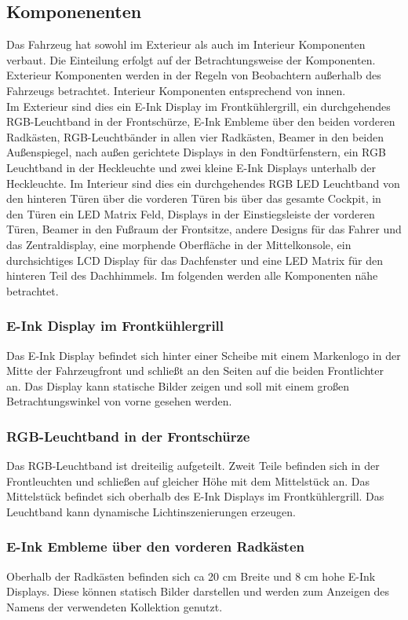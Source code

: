\subsection{Komponenenten}
Das Fahrzeug hat sowohl im Exterieur als auch im Interieur Komponenten verbaut. Die Einteilung erfolgt auf der Betrachtungsweise der Komponenten. Exterieur Komponenten werden in der Regeln von Beobachtern außerhalb des Fahrzeugs betrachtet. Interieur Komponenten entsprechend von innen.\\
Im Exterieur sind dies ein E-Ink Display im Frontkühlergrill, ein durchgehendes RGB-Leuchtband in der Frontschürze, E-Ink Embleme über den beiden vorderen Radkästen, RGB-Leuchtbänder in allen vier Radkästen, Beamer in den beiden Außenspiegel, nach außen gerichtete Displays in den Fondtürfenstern, ein RGB Leuchtband in der Heckleuchte und zwei kleine E-Ink Displays unterhalb der Heckleuchte.
Im Interieur sind dies ein durchgehendes RGB LED Leuchtband von den hinteren Türen über die vorderen Türen bis über das gesamte Cockpit, in den Türen ein LED Matrix Feld, Displays in der Einstiegsleiste der vorderen Türen, Beamer in den Fußraum der Frontsitze, andere Designs für das Fahrer und das Zentraldisplay, eine morphende Oberfläche in der Mittelkonsole, ein durchsichtiges LCD Display für das Dachfenster und eine LED Matrix für den hinteren Teil des Dachhimmels.
Im folgenden werden alle Komponenten nähe betrachtet.
\subsubsection{E-Ink Display im Frontkühlergrill}
Das E-Ink Display befindet sich hinter einer Scheibe mit einem Markenlogo in der Mitte der Fahrzeugfront und schließt an den Seiten auf die beiden Frontlichter an. Das Display kann statische Bilder zeigen und soll mit einem großen Betrachtungswinkel von vorne gesehen werden.
\subsubsection{RGB-Leuchtband in der Frontschürze}
Das RGB-Leuchtband ist dreiteilig aufgeteilt. Zweit Teile befinden sich in der Frontleuchten und schließen auf gleicher Höhe mit dem Mittelstück an. Das Mittelstück befindet sich oberhalb des E-Ink Displays im Frontkühlergrill. Das Leuchtband kann dynamische Lichtinszenierungen erzeugen.
\subsubsection{E-Ink Embleme über den vorderen Radkästen}
Oberhalb der Radkästen befinden sich ca 20 cm Breite und 8 cm hohe E-Ink Displays. Diese können statisch Bilder darstellen und werden zum Anzeigen des Namens der verwendeten Kollektion genutzt.

